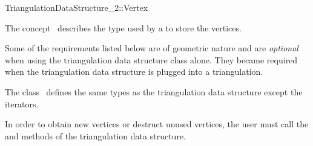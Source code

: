 

\begin{ccRefConcept}{TriangulationDataStructure_2::Vertex}


\ccDefinition
  
The concept \ccRefName\ describes the type used by a
 to store the vertices.

Some of the requirements listed below are of geometric nature
and are \textit{optional}
when using the triangulation data structure class alone.
They became required when the triangulation data structure is plugged
into a triangulation.


\ccTypes
The class \ccRefName\ defines the same types as 
the triangulation data structure 
except the iterators.



\ccCreation

In order to obtain new vertices or destruct unused vertices, the user must
call the  and  methods of the
triangulation data structure.





\end{ccRefConcept}
